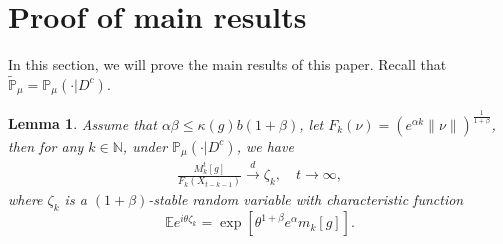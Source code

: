 \documentclass[12pt, a4paper]{amsart}
\newtheorem{lem}[thm]{Lemma}
\theoremstyle{definition}
\numberwithin{equation}{section}
\begin{document}
\section{Proof of main results}

In this section, we will prove the main results of this paper. Recall that $\mathbb{\tilde{P}}_{\mu}=\mathbb{P}_{\mu}(\cdot|D^c)$.
 \begin{lem}\label{lemma31}
 Assume that $\alpha\beta\leq \kappa(g)b(1+\beta)$, let $F_k(\nu)=\left(e^{\alpha k}\|\nu\|\right)^{\frac{1}{1+\beta}}$, then for any  $k\in\mathbb{N}$, under $\mathbb{P}_{\mu}(\cdot | D ^c)$, we have
 \begin{align}
      \frac{M_k^t[g]}{F_k(X_{t-k-1})}\xrightarrow{d}\zeta_k, \quad t\rightarrow \infty, \label{limitdistribution1}
 \end{align}
 where $\zeta_k$ is a $(1+\beta)$-stable random variable with characteristic function
 $$\mathbb{E}e^{i\theta\zeta_k}=\exp\left[\theta^{1+\beta}e^{\alpha}m_k[g]\right].$$
 \end{lem}
\end{document}
